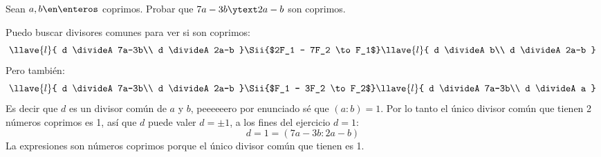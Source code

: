 \begin{enunciado}{\ejercicio}
  Sean $a,b \en \enteros$ coprimos.
  Probar que $7a - 3b \ytext 2a -b$ son coprimos.
\end{enunciado}

Puedo buscar divisores comunes para ver si son coprimos:
$$
  \llave{l}{
    d \divideA 7a-3b\\
    d \divideA 2a-b
  }
  \Sii{$2F_1 - 7F_2 \to F_1$}
  \llave{l}{
    d \divideA b\\
    d \divideA 2a-b
  }
$$
Pero también:
$$
  \llave{l}{
    d \divideA 7a-3b\\
    d \divideA 2a-b
  }
  \Sii{$F_1 - 3F_2 \to F_2$}
  \llave{l}{
    d \divideA 7a-3b\\
    d \divideA a
  }
$$
Es decir que $d$ es un divisor común de $a$ y $b$, peeeeeero por enunciado sé que $(a:b) = 1$.
Por lo tanto el único divisor común que tienen 2 números coprimos es 1, así que $d$ puede valer
$d = \pm 1$, a los fines del ejercicio $d = 1$:
$$
  d = 1 = (7a - 3b : 2a -b)
$$
La expresiones son números coprimos porque el único divisor común que tienen es 1.

\begin{aportes}
  \item {}
\end{aportes}

